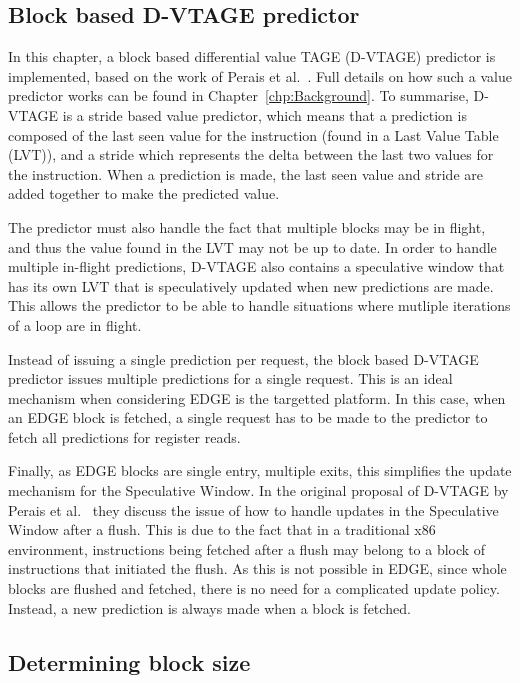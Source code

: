 \subsection{Block based D-VTAGE predictor}

In this chapter, a block based differential value TAGE (D-VTAGE) predictor is implemented, based on the work of Perais et al.~\cite{peraisBeBop2015}.
Full details on how such a value predictor works can be found in Chapter~\ref{chp:Background}.
To summarise, D-VTAGE is a stride based value predictor, which means that a prediction is composed of the last seen value for the instruction (found in a Last Value Table (LVT)), and a stride which represents the delta between the last two values for the instruction.
When a prediction is made, the last seen value and stride are added together to make the predicted value.

The predictor must also handle the fact that multiple blocks may be in flight, and thus the value found in the LVT may not be up to date.
In order to handle multiple in-flight predictions, D-VTAGE also contains a speculative window that has its own LVT that is speculatively updated when new predictions are made.
This allows the predictor to be able to handle situations where mutliple iterations of a loop are in flight.

Instead of issuing a single prediction per request, the block based D-VTAGE predictor issues multiple predictions for a single request.
This is an ideal mechanism when considering EDGE is the targetted platform.
In this case, when an EDGE block is fetched, a single request has to be made to the predictor to fetch all predictions for register reads.

Finally, as EDGE blocks are single entry, multiple exits, this simplifies the update mechanism for the Speculative Window.
In the original proposal of D-VTAGE by Perais et al.~\cite{peraisBeBop2015} they discuss the issue of how to handle updates in the Speculative Window after a flush.
This is due to the fact that in a traditional x86 environment, instructions being fetched after a flush may belong to a block of instructions that initiated the flush.
As this is not possible in EDGE, since whole blocks are flushed and fetched, there is no need for a complicated update policy.
Instead, a new prediction is always made when a block is fetched.

\subsection{Determining block size}

